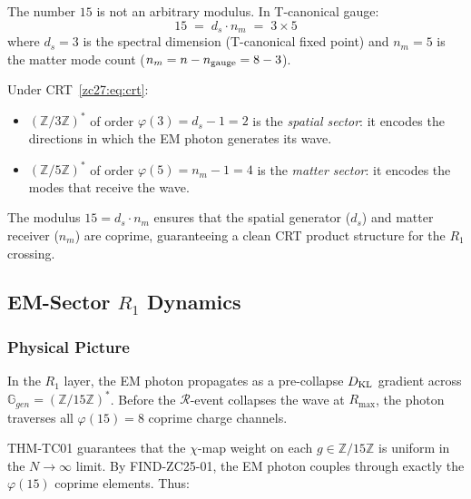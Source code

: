 \documentclass[12pt, a4paper]{article}
\begin{document}
\begin{derivedbox}[title={FIND-ZC27-02: $15 = d_s \cdot n_m$
  --- Prime Factorisation Encodes Physics}]
The number $15$ is not an arbitrary modulus.
In T-canonical gauge:
\begin{equation}
  15 \;=\; d_s \cdot n_m \;=\; 3 \times 5
  \tag{ZC27-FACT}\label{zc27:eq:fact}
\end{equation}
where $d_s = 3$ is the spectral dimension
(T-canonical fixed point) and $n_m = 5$ is the matter mode count
($n_m = n - n_{\rm gauge} = 8 - 3$).

Under CRT~\eqref{zc27:eq:crt}:
\begin{itemize}[leftmargin=*, noitemsep]
  \item $(\mathbb{Z}/3\mathbb{Z})^*$ of order $\varphi(3) = d_s - 1 = 2$
    is the \emph{spatial sector}: it encodes the directions
    in which the EM photon generates its wave.
  \item $(\mathbb{Z}/5\mathbb{Z})^*$ of order $\varphi(5) = n_m - 1 = 4$
    is the \emph{matter sector}: it encodes the modes
    that receive the wave.
\end{itemize}
The modulus $15 = d_s \cdot n_m$ ensures that the spatial
generator ($d_s$) and matter receiver ($n_m$) are coprime,
guaranteeing a clean CRT product structure for the $R_1$
crossing.
\end{derivedbox}

\subsection{EM-Sector $R_1$ Dynamics}
\label{zc27:sec:r1em}

\subsubsection{Physical Picture}

In the $R_1$ layer, the EM photon propagates as a
pre-collapse $D_{\rm KL}$ gradient across
$\mathbb{G}_{gen} = (\mathbb{Z}/15\mathbb{Z})^*$.
Before the $\mathcal{R}$-event collapses the wave
at $R_{\max}$, the photon traverses all $\varphi(15) = 8$
coprime charge channels.

THM-TC01 guarantees that the $\chi$-map weight on each
$g \in \mathbb{Z}/15\mathbb{Z}$ is uniform in the
$N \to \infty$ limit. By FIND-ZC25-01, the EM photon
couples through exactly the $\varphi(15)$ coprime
elements. Thus:
\end{document}
